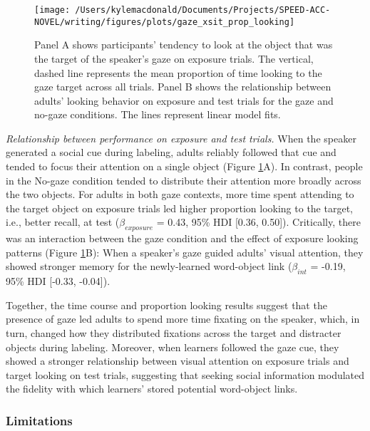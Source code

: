 \documentclass[man,floatsintext]{apa6}
\begin{document}
\begin{figure}[!t]

{\centering \texttt{[image: /Users/kylemacdonald/Documents/Projects/SPEED-ACC-NOVEL/writing/figures/plots/gaze\_xsit\_prop\_looking]} 

}

\caption{Panel A shows participants’ tendency to look at the object that was the target of the speaker’s gaze on exposure trials. The vertical, dashed line represents the mean proportion of time looking to the gaze target across all trials. Panel B shows the relationship between adults' looking behavior on exposure and test trials for the gaze and no-gaze conditions. The lines represent linear model fits.}\label{fig:gaze-xsit-prop-looking-plot}
\end{figure}

\emph{Relationship between performance on exposure and test trials.}
When the speaker generated a social cue during labeling, adults reliably
followed that cue and tended to focus their attention on a single object
(Figure \ref{fig:gaze-xsit-prop-looking-plot}A). In contrast, people in
the No-gaze condition tended to distribute their attention more broadly
across the two objects. For adults in both gaze contexts, more time
spent attending to the target object on exposure trials led higher
proportion looking to the target, i.e., better recall, at test
(\(\beta_{exposure}\) = 0.43, 95\% HDI {[}0.36, 0.50{]}). Critically,
there was an interaction between the gaze condition and the effect of
exposure looking patterns (Figure
\ref{fig:gaze-xsit-prop-looking-plot}B): When a speaker's gaze guided
adults' visual attention, they showed stronger memory for the
newly-learned word-object link (\(\beta_{int}\) = -0.19, 95\% HDI
{[}-0.33, -0.04{]}).

Together, the time course and proportion looking results suggest that
the presence of gaze led adults to spend more time fixating on the
speaker, which, in turn, changed how they distributed fixations across
the target and distracter objects during labeling. Moreover, when
learners followed the gaze cue, they showed a stronger relationship
between visual attention on exposure trials and target looking on test
trials, suggesting that seeking social information modulated the
fidelity with which learners' stored potential word-object links.

\subsubsection{Limitations}\label{limitations}
\end{document}
